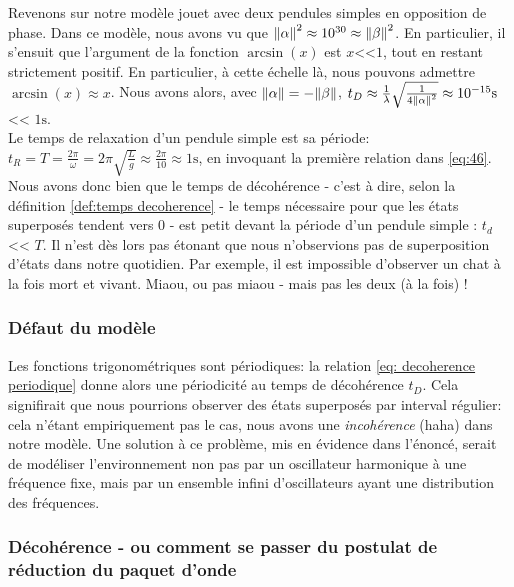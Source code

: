 \documentclass[11pt,oneside,a4paper]{article}
\begin{document}
Revenons sur notre modèle jouet avec deux pendules simples en opposition de phase. Dans ce modèle, nous avons vu que $\norm{\alpha}^2\approx 10^{30}\approx\norm{\beta}^2$. En particulier, il s'ensuit que l'argument de la fonction $\arcsin(x)$ est $x$<<$1$, tout en restant strictement positif. En particulier, à cette échelle là, nous pouvons admettre $\arcsin(x)\approx x$. Nous avons alors, avec $\norm{\alpha}=-\norm{\beta}$, $t_D \approx \frac{1}{\lambda}\sqrt{\frac{1}{4\norm{\alpha}^2}}\approx 10^{-15}\unit{\second}$ << $1\unit{\second}$.\\

Le temps de relaxation d'un pendule simple est sa période: $t_R=T=\frac{2\pi}{\omega}=2\pi\sqrt{\frac{L}{g}}\approx \frac{2\pi}{10}\approx1\unit{\second}$, en invoquant la première relation dans \eqref{eq:46}.\\

Nous avons donc bien que le temps de décohérence - c'est à dire, selon la définition \ref{def:temps decoherence} - le temps nécessaire pour que les états superposés tendent vers 0 - est petit devant la période d'un pendule simple : $t_d$ << $T$. Il n'est dès lors pas étonant que nous n'observions pas de superposition d'états dans notre quotidien. Par exemple, il est impossible d'observer un chat à la fois mort et vivant. Miaou, ou pas miaou - mais pas les deux (à la fois) !


\subsubsection{Défaut du modèle}

Les fonctions trigonométriques sont périodiques: la relation \eqref{eq: decoherence periodique} donne alors une périodicité au temps de décohérence $t_D$. Cela signifirait que nous pourrions observer des états superposés par interval régulier: cela n'étant empiriquement pas le cas, nous avons une \emph{incohérence} (haha) dans notre modèle. Une solution à ce problème, mis en évidence dans l'énoncé, serait de modéliser l'environnement non pas par un oscillateur harmonique à une fréquence fixe, mais par un ensemble infini d'oscillateurs ayant une distribution des fréquences.\\

\subsubsection{Décohérence - ou comment se passer du postulat de réduction du paquet d'onde}
\end{document}
